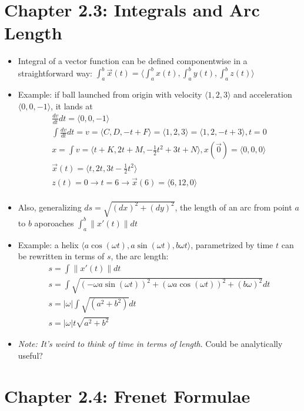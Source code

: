 \documentclass[11pt, oneside]{article}   	%
\begin{document}
\section{Chapter 2.3: Integrals and Arc Length}
\begin{itemize}
\item Integral of a vector function can be defined componentwise in a straightforward way: $\int_a^b {\overrightarrow{x}(t)} = \langle \int_a^b {x(t)},  \int_a^b {y(t)},  \int_a^b {z(t)} \rangle $ 
\item Example: if ball launched from origin with velocity $\langle 1, 2, 3 \rangle$ and acceleration $\langle 0, 0, -1 \rangle$, it lands at
\begin{align} 
\frac{dv}{dt}dt = \langle 0, 0, -1 \rangle \\ 
\int{\frac{dv}{dt}dt} = v =  \langle C , D , -t +F \rangle  = \langle 1, 2, 3 \rangle =  \langle 1, 2, -t + 3\rangle, t = 0 \\
x = \int{v}  = \langle t+K, 2t+M, -\frac{1}{2}t^2 + 3t + N \rangle, x(\overrightarrow{0}) = \langle 0 ,0, 0\rangle \\ 
\overrightarrow{x}(t) = \langle t, 2t, 3t-\frac{1}{2}t^2 \rangle \\
z(t) = 0 \rightarrow t = 6 \rightarrow \overrightarrow{x}(6) = \langle 6, 12, 0 \rangle \\
\end{align} 
\item Also, generalizing $ds = \sqrt{(dx)^2  + (dy)^2}$, the length of an arc from point $a$ to $b$ aporoaches $\int_a^b \| x'(t) \| dt$
\item Example: a helix $\langle a \cos (\omega t), a \sin (\omega t), b \omega t \rangle$, parametrized by time $t$ can be rewritten in terms of $s$, the arc length: 
\begin{align}
s =  \int \|x'(t)\| dt \\
s = \int \sqrt{(-\omega a \sin (\omega t))^2 + (\omega a \cos (\omega t))^2 + (b \omega)^2}dt \\
s = |\omega| \int \sqrt{(a^2 + b^2)}dt \\ 
s = |\omega| t \sqrt{a^2 + b^2}
\end{align}
\item \emph{Note: It's weird to think of time in terms of length}.  Could be analytically useful?
\end{itemize}


\section{Chapter 2.4: Frenet Formulae}
\end{document}
